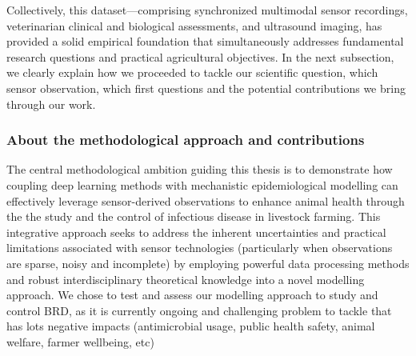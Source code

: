 Collectively, this dataset—comprising synchronized multimodal sensor recordings, veterinarian clinical and biological assessments, and ultrasound imaging, has provided a solid empirical foundation that simultaneously addresses fundamental research questions and practical agricultural objectives. In the next subsection, we clearly explain how we proceeded to tackle our scientific question, which sensor observation, which first questions and the potential contributions we bring through our work.

 

\subsubsection*{About the methodological approach and contributions}

The central methodological ambition guiding this thesis is to demonstrate how coupling deep learning methods with mechanistic epidemiological modelling can effectively leverage sensor-derived observations to enhance animal health through the the study and the control of infectious disease in livestock farming. This integrative approach seeks to address the inherent uncertainties and practical limitations associated with sensor technologies (particularly when observations are sparse, noisy and incomplete) by employing powerful data processing methods and robust interdisciplinary theoretical knowledge into a novel modelling approach. We chose to test and assess our modelling approach to study and control BRD, as it is currently ongoing and challenging problem to tackle that has lots negative impacts (antimicrobial usage, public health safety, animal welfare, farmer wellbeing, etc)

